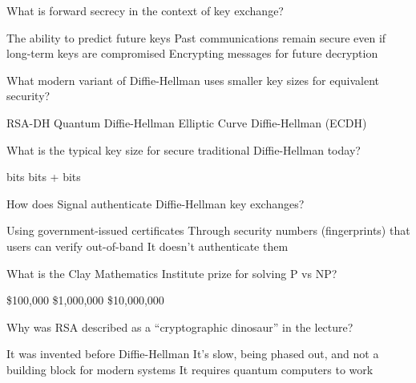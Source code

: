 \documentclass[10pt,a4paper,american]{exam}
\begin{document}
\begin{questions}
	\question What is forward secrecy in the context of key exchange?
	\begin{randomizechoices}
		\choice The ability to predict future keys
		\CorrectChoice Past communications remain secure even if long-term keys are compromised
		\choice Encrypting messages for future decryption
	\end{randomizechoices}

	\question What modern variant of Diffie-Hellman uses smaller key sizes for equivalent security?
	\begin{randomizechoices}
		\choice RSA-DH
		\choice Quantum Diffie-Hellman
		\CorrectChoice Elliptic Curve Diffie-Hellman (ECDH)
	\end{randomizechoices}

	\question What is the typical key size for secure traditional Diffie-Hellman today?
	\begin{randomizechoices}
		 bits
		 bits
		+ bits
	\end{randomizechoices}

	\question How does Signal authenticate Diffie-Hellman key exchanges?
	\begin{randomizechoices}
		\choice Using government-issued certificates
		\CorrectChoice Through security numbers (fingerprints) that users can verify out-of-band
		\choice It doesn't authenticate them
	\end{randomizechoices}

	\question What is the Clay Mathematics Institute prize for solving P vs NP?
	\begin{randomizechoices}
		\choice \$100,000
		\CorrectChoice \$1,000,000
		\choice \$10,000,000
	\end{randomizechoices}

	\question Why was RSA described as a ``cryptographic dinosaur'' in the lecture?
	\begin{randomizechoices}
		\choice It was invented before Diffie-Hellman
		\CorrectChoice It's slow, being phased out, and not a building block for modern systems
		\choice It requires quantum computers to work
	\end{randomizechoices}

\end{questions}

\clearpage

\end{document}
